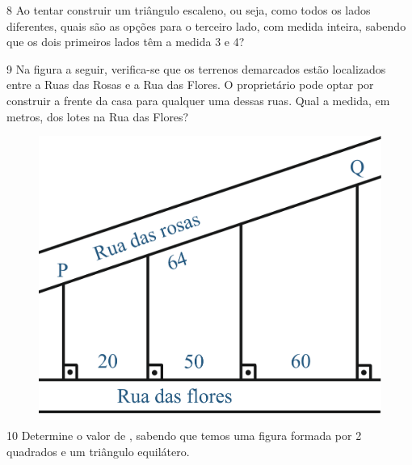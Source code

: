 \num{8} Ao tentar construir um triângulo escaleno, ou seja, como todos os
lados diferentes, quais são as opções para o terceiro lado, com medida
inteira, sabendo que os dois primeiros lados têm a medida 3 e 4?

\begin{emptybox}
\end{emptybox}

\pagebreak
\num{9} Na figura a seguir, verifica-se que os terrenos demarcados estão 
localizados entre a Ruas das Rosas e a Rua das Flores. O proprietário pode 
optar por construir a frente da casa para qualquer uma dessas ruas. Qual a 
medida, em metros, dos lotes na Rua das Flores?

\begin{figure}[htpb!]
\centering
\includegraphics[width=.5\textwidth]{./ilustras-mat/modulo_11-atividade_9.png}
\end{figure}

\begin{emptybox}
\end{emptybox}

\num{10} Determine o valor de \alpha, sabendo que temos uma figura formada por 2
quadrados e um triângulo equilátero.

